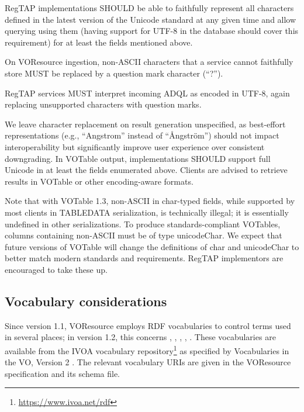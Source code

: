 \documentclass[11pt,a4paper]{ivoa}
\begin{document}
RegTAP implementations SHOULD be able to faithfully represent all
characters defined in the latest version of the Unicode standard
\citep{std:UNICODE} at
any given time and allow querying using them (having support for UTF-8
in the database should cover this requirement) for at least the fields
mentioned above.

On VOResource ingestion, non-ASCII characters that a service cannot
faithfully store MUST be replaced by a question mark character (``?'').

RegTAP services MUST interpret incoming ADQL as encoded in UTF-8,
again replacing unsupported characters with question marks.

We leave character replacement on result generation unspecified, as
best-effort representations (e.g., ``Angstrom'' instead of ``Ångström'')
should not impact interoperability but significantly improve user
experience over consistent downgrading.  In VOTable output,
implementations SHOULD support full Unicode in at least the fields
enumerated above.  Clients are advised to retrieve results in VOTable or
other encoding-aware formats.

Note that with VOTable 1.3, non-ASCII in char-typed fields, while
supported by most clients in TABLEDATA serialization, is technically
illegal; it is essentially undefined in other serializations.  To
produce standards-compliant VOTables, columns containing non-ASCII must
be of type unicodeChar.  We expect that future versions of VOTable will
change the definitions of char and unicodeChar to better match modern
standards and requirements.  RegTAP implementors are encouraged to take
these up.

\subsection{Vocabulary considerations}

\label{sect:vocab-use}

Since version 1.1, VOResource employs RDF vocabularies to control terms
used in several places; in version 1.2, this concerns
, ,
,
, .
These vocabularies are available from the IVOA vocabulary
repository\footnote{\url{https://www.ivoa.net/rdf}} as specified by
Vocabularies in the VO, Version 2 \citep{2023ivoa.spec.0206D}.  The
relevant vocabulary URIs are given in the VOResource specification and its
schema file.
\end{document}

